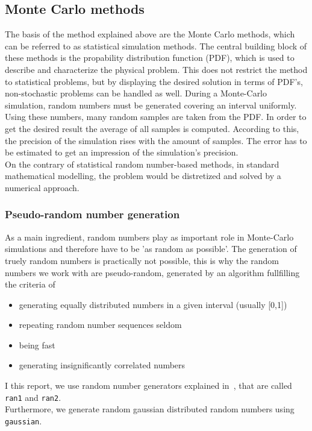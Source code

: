 \subsection{Monte Carlo methods}
The basis of the method explained above are the Monte Carlo methods, which can be referred to as statistical simulation methods. The central building block of these methods is the propability distribution function (PDF), which is used to describe and characterize the physical problem. This does not restrict the method to statistical problems, but by displaying the desired solution in terms of PDF's, non-stochastic problems can be handled as well. During a Monte-Carlo simulation, random numbers must be generated covering an interval uniformly. Using these numbers, many random samples are taken from the PDF. In order to get the desired result the average of all samples is computed. According to this, the precision of the simulation rises with the amount of samples. The error has to be estimated to get an impression of the simulation's precision.\\
On the contrary of statistical random number-based methods, in standard mathematical modelling, the problem would be distretized and solved by a numerical approach.\\
\subsubsection{Pseudo-random number generation}\label{sec:ran}
As a main ingredient, random numbers play as important role in Monte-Carlo simulations and therefore have to be 'as random as possible'. The generation of truely random numbers is practically not possible, this is why the random numbers we work with are pseudo-random, generated by an algorithm fullfilling the criteria of
\begin{itemize}
\item generating equally distributed numbers in a given interval (usually [0,1])
\item repeating random number sequences seldom
\item being fast
\item generating insignificantly correlated numbers
\end{itemize}
I this report, we use random number generators explained in~\cite{numerical}, that are called \texttt{ran1} and \texttt{ran2}.\\
Furthermore, we generate random gaussian distributed random numbers using \texttt{gaussian}. 
